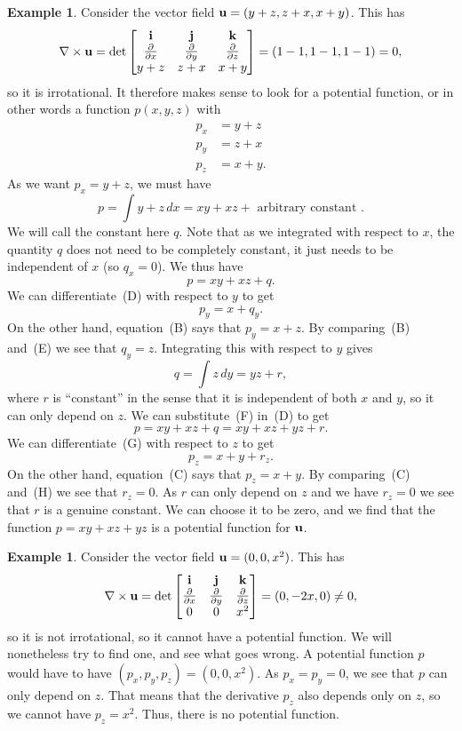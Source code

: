 \documentclass[reqno]{amsart}
\theoremstyle{definition}
\newtheorem{example}[theorem]{Example}
\begin{document}
\begin{example}
 Consider the vector field $\mathbf{u}=(y+z,z+x,x+y)$.  This has
 \[ \nabla\times\mathbf{u} = 
  \det\left[\begin{matrix} \mathbf{i} & \mathbf{j} & \mathbf{k} \\
           \frac{\partial}{\partial x} & \frac{\partial}{\partial y} & \frac{\partial}{\partial z} \\
           y+z & z+x & x+y \end{matrix}\right] = 
   (1-1,1-1,1-1) = 0,
 \]
 so it is irrotational.  It therefore makes sense to look for a
 potential function, or in other words a function $p(x,y,z)$ with
 \begin{align*}
  p_x &= y+z \tag{A} \\
  p_y &= z+x \tag{B} \\
  p_z &= x+y. \tag{C}
 \end{align*}
 As we want $p_x=y+z$, we must have
 \[ p = \int y+z\,dx = xy+xz + \text{ arbitrary constant }. \]
 We will call the constant here $q$.  Note that as we integrated with
 respect to $x$, the quantity $q$ does not need to be completely
 constant, it just needs to be independent of $x$ (so $q_x=0$).  We
 thus have 
 \[ p = xy+xz+q. \tag{D} \]
 We can differentiate~(D) with respect to $y$ to get 
 \[ p_y=x+q_y. \tag{E} \] 
 On the other hand, equation~(B) says that $p_y=x+z$.  By
 comparing~(B) and~(E) we see that $q_y=z$.  Integrating this with
 respect to $y$ gives 
 \[ q = \int z\,dy = yz + r, \tag{F} \]
 where $r$ is ``constant'' in the sense that it is independent of both
 $x$ and $y$, so it can only depend on $z$.  We can substitute~(F)
 in~(D) to get 
 \[ p = xy+xz+q=xy+xz+yz+r. \tag{G} \]
 We can differentiate~(G) with respect to $z$ to get
 \[ p_z = x+y+r_z. \tag{H} \]
 On the other hand, equation~(C) says that $p_z=x+y$.  By
 comparing~(C) and~(H) we see that $r_z=0$.  As $r$ can only depend on
 $z$ and we have $r_z=0$ we see that $r$ is a genuine constant.  We
 can choose it to be zero, and we find that the function $p=xy+xz+yz$
 is a potential function for $\mathbf{u}$.  
\end{example}
\begin{example}
 Consider the vector field $\mathbf{u}=(0,0,x^2)$.  This has
 \[ \nabla\times\mathbf{u} = 
  \det\left[\begin{matrix} \mathbf{i} & \mathbf{j} & \mathbf{k} \\
           \frac{\partial}{\partial x} & \frac{\partial}{\partial y} & \frac{\partial}{\partial z} \\
           0 & 0 & x^2 \end{matrix}\right] = 
   (0,-2x,0) \neq 0,
 \]
 so it is not irrotational, so it cannot have a potential function.
 We will nonetheless try to find one, and see what goes wrong.  A
 potential function $p$ would have to have $(p_x,p_y,p_z)=(0,0,x^2)$.
 As $p_x=p_y=0$, we see that $p$ can only depend on $z$.  That means
 that the derivative $p_z$ also depends only on $z$, so we cannot have
 $p_z=x^2$.  Thus, there is no potential function.
\end{example}
\end{document}
